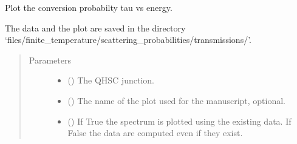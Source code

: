 \documentclass[letterpaper,10pt,english]{sphinxmanual}
\begin{document}
\begin{fulllineitems}
\label{\detokenize{modules:modules.utils.plot_tau_vs_energy}}
\pysigstartsignatures
{}
\pysigstopsignatures
\sphinxAtStartPar
Plot the conversion probabilty tau vs energy.

\sphinxAtStartPar
The data and the plot are saved in the directory
‘files/finite\_temperature/scattering\_probabilities/transmissions/’.
\begin{quote}\begin{description}
\item[{Parameters}] \leavevmode\begin{itemize}
\item {} 
\sphinxAtStartPar
{} () \textendash{} The QH\sphinxhyphen{}SC junction.

\item {} 
\sphinxAtStartPar
{} () \textendash{} The name of the plot used for the manuscript, optional.

\item {} 
\sphinxAtStartPar
{} () \textendash{} If True the spectrum is plotted using the existing data.
If False the data are computed even if they exist.

\end{itemize}

\end{description}\end{quote}

\end{fulllineitems}

\end{document}
